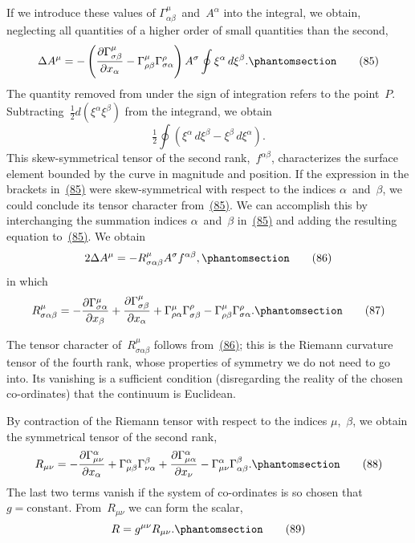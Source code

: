 \documentclass[12pt]{book}[2005/09/16]
\newcommand{\Change}[2]{#2}
\newcommand{\Add}[1]{\Change{}{#1}}
\newcommand{\PageSep}[1]{\ignorespaces}
\newcommand{\Tag}[1]{%
  \phantomsection
  \label{eqn:#1}
  \tag*{#1}
}
\newcommand{\Eqref}[1]{\hyperref[eqn:#1]{#1}}
\newcommand{\dd}{\partial}
\newcommand{\Oint}{\oint}%
\begin{document}
If we introduce these values of $\Gamma_{\alpha\beta}^{\mu}$~and~$A^{\alpha}$ into the
integral, we obtain, neglecting all quantities of a higher
order of small quantities than the second,
\[
\Delta A^{\mu}
  = - \left(\frac{\dd \Gamma_{\sigma\beta}^{\mu}}{\dd x_{\alpha}}
      - \Gamma_{\rho\beta}^{\mu} \Gamma_{\sigma\alpha}^{\rho}\right)
    A^{\sigma} \Oint \xi^{\alpha}\, d\xi^{\beta}\Add{.}
\Tag{(85)}
\]
The quantity removed from under the sign of integration
\PageSep{85}
refers to the point~$P$. Subtracting~$\frac{1}{2} d(\xi^{\alpha} \xi^{\beta})$ from the
integrand, we obtain
\[
\tfrac{1}{2} \Oint (\xi^{\alpha}\, d\xi^{\beta} - \xi^{\beta}\, d\xi^{\alpha}).
\]
This skew-symmetrical tensor of the second rank,~$\Change{f_{\alpha\beta}}{f^{\alpha\beta}}$,
characterizes the surface element bounded by the curve
in magnitude and position. If the expression in the
brackets in~\Eqref{(85)} were skew-symmetrical with respect to
the indices $\alpha$~and~$\beta$, we could conclude its tensor character
from~\Eqref{(85)}. We can accomplish this by interchanging
the summation indices $\alpha$~and~$\beta$ in~\Eqref{(85)} and adding the
resulting equation to~\Eqref{(85)}. We obtain
\[
2\Delta A^{\mu} = -R_{\sigma\alpha\beta}^{\mu} A^{\sigma} f^{\alpha\beta}\Add{,}
\Tag{(86)}
\]
in which
\[
R_{\sigma\alpha\beta}^{\mu}
  = - \frac{\dd \Gamma_{\sigma\alpha}^{\mu}}{\dd x_{\beta}}
    + \frac{\dd \Gamma_{\sigma\beta}^{\mu}}{\dd x_{\alpha}}
    + \Gamma_{\rho\alpha}^{\mu} \Gamma_{\sigma\beta}^{\rho}
    - \Gamma_{\rho\beta}^{\mu} \Gamma_{\sigma\alpha}^{\rho}\Add{.}
\Tag{(87)}
\]

The tensor character of~$R_{\sigma\alpha\beta}^{\mu}$ follows from~\Eqref{(86)}; this is
the Riemann curvature tensor of the fourth rank, whose
%
properties of symmetry we do not need to go into. Its
vanishing is a sufficient condition (disregarding the reality
of the chosen co-ordinates) that the continuum is
Euclidean.

By contraction of the Riemann tensor with respect to
the indices $\mu$,~$\beta$, we obtain the symmetrical tensor of the
second rank,
\[
R_{\mu\nu}
  = - \frac{\dd \Gamma_{\mu\nu}^{\alpha}}{\dd x_{\alpha}}
    + \Gamma_{\mu\beta}^{\alpha} \Gamma_{\nu\alpha}^{\beta}
    + \frac{\dd \Gamma_{\mu\alpha}^{\alpha}}{\dd x_{\nu}}
    - \Gamma_{\mu\nu}^{\alpha}\Gamma_{\alpha\beta}^{\beta}\Add{.}
\Tag{(88)}
\]
The last two terms vanish if the system of co-ordinates
\PageSep{86}
is so chosen that $g = \text{constant}$. From~$R_{\mu\nu}$ we can form
the scalar,
\[
R = g^{\mu\nu} R_{\mu\nu}\Add{.}
\Tag{(89)}
\]
\end{document}
